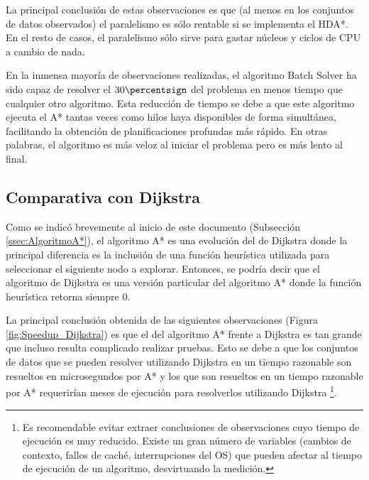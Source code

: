 La principal conclusión de estas observaciones es que
(al menos en los conjuntos de datos observados)
el paralelismo es sólo rentable si se implementa el HDA*.
En el resto de casos, el paralelismo sólo sirve para
gastar núcleos y ciclos de CPU a cambio de nada.

\begin{notebox}
    En la inmensa mayoría de observaciones realizadas,
    el algoritmo Batch Solver
    ha sido capaz de resolver el $30\percentsign$ del problema
    en menos tiempo que cualquier otro algoritmo.
    Esta reducción de tiempo se debe a que este algoritmo ejecuta el A*
    tantas veces como hilos haya disponibles de forma simultánea,
    facilitando la obtención de planificaciones profundas más rápido. 
    En otras palabras, el algoritmo es más veloz al iniciar el problema
    pero es más lento al final.
\end{notebox}

\subsection{Comparativa con Dijkstra}
\label{sec:ComparativaDijkstra}

Como se indicó brevemente al inicio de este documento (Subsección \ref{ssec:AlgoritmoA*}),
el algoritmo A* es una evolución del de Dijkstra
donde la principal diferencia es la inclusión de una función
heurística utilizada para seleccionar el siguiente nodo a explorar.
Entonces, se podría decir que el algoritmo de Dijkstra es una
versión particular del algoritmo A* donde la función heurística
retorna siempre 0.

La principal conclusión obtenida de las siguientes observaciones 
(Figura \ref{fig:Speedup_Dijkstra}) es que el 
del algoritmo A* frente a Dijkstra
es tan grande que incluso resulta complicado realizar pruebas.
Esto se debe a que los conjuntos de datos que se pueden
resolver utilizando Dijkstra en un tiempo razonable son resueltos
en microsegundos por A* y los que son resueltos en un tiempo
razonable por A* requerirían meses de ejecución para resolverlos
utilizando Dijkstra
\footnote{
    Es recomendable evitar extraer conclusiones de observaciones cuyo tiempo de ejecución es muy reducido.
    Existe un gran número de variables (cambios de contexto, fallos de caché, interrupciones del OS)
    que pueden afectar al tiempo de ejecución de un algoritmo,
    desvirtuando la medición.
}.

